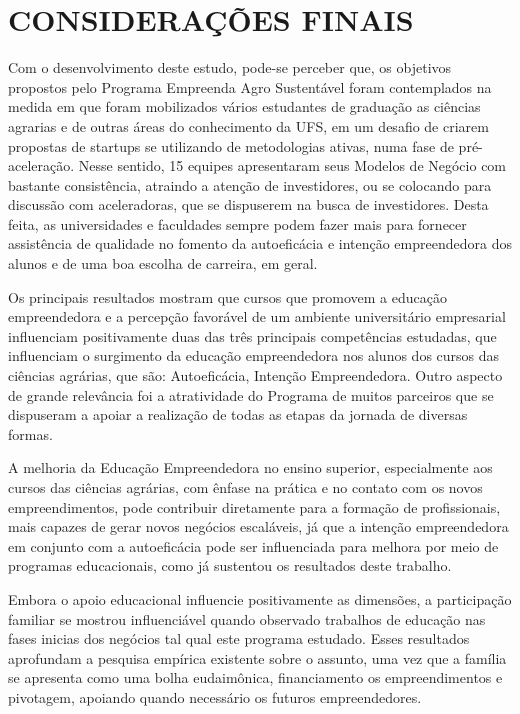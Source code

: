 \chapter{CONSIDERAÇÕES FINAIS}


Com o desenvolvimento deste estudo, pode-se perceber que, os objetivos propostos pelo Programa Empreenda Agro Sustentável foram contemplados na medida em que foram mobilizados vários estudantes de graduação as ciências agrarias e de outras áreas do conhecimento da UFS, em um desafio de criarem propostas de startups se utilizando de metodologias ativas, numa fase de pré-aceleração.  Nesse sentido, 15 equipes apresentaram seus Modelos de Negócio com bastante consistência, atraindo a atenção de investidores, ou se colocando para discussão com aceleradoras, que se dispuserem na busca de investidores. Desta feita, as universidades e faculdades sempre podem fazer mais para fornecer assistência de qualidade no fomento da autoeficácia e intenção empreendedora dos alunos e de uma boa escolha de carreira, em geral.


Os principais resultados mostram que cursos que promovem a educação empreendedora e a percepção favorável de um ambiente universitário empresarial influenciam positivamente duas das três principais competências estudadas, que influenciam o surgimento da educação empreendedora nos alunos dos cursos das ciências agrárias, que são: Autoeficácia, Intenção Empreendedora. Outro aspecto de grande relevância foi a atratividade do Programa de muitos parceiros que se dispuseram a apoiar a realização de todas as etapas da jornada de diversas formas. 

A melhoria da Educação Empreendedora no ensino superior, especialmente aos cursos das ciências agrárias, com ênfase na prática e no contato com os novos empreendimentos, pode contribuir diretamente para a formação de profissionais, mais capazes de gerar novos negócios escaláveis, já que a intenção empreendedora em conjunto com a autoeficácia pode ser influenciada para melhora por meio de programas educacionais, como já sustentou os resultados deste trabalho. 

Embora o apoio educacional influencie positivamente as dimensões, a participação familiar se mostrou influenciável quando observado trabalhos de educação nas fases inicias dos negócios tal qual este programa estudado. Esses resultados aprofundam a pesquisa empírica existente sobre o assunto, uma vez que a família se apresenta como uma bolha eudaimônica, financiamento os empreendimentos e pivotagem, apoiando quando necessário os futuros empreendedores. 


